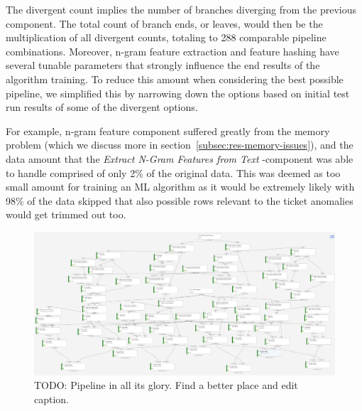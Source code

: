 The divergent count implies the number of branches
diverging from the previous component.
The total count of branch ends, or leaves,
would then be the multiplication of all divergent counts,
totaling to 288 comparable pipeline combinations.
Moreover,
n-gram feature extraction and feature hashing
have several tunable parameters
that strongly influence the end results of the algorithm training.
To reduce this amount when considering the best possible pipeline,
we simplified this by narrowing down the options
based on initial test run results of some of the divergent options.

For example,
n-gram feature component suffered greatly from the memory problem
(which we discuss more in section~\ref{subsec:res-memory-issues}),
and the data amount that the \textit{Extract N-Gram Features from Text} -component was able to handle
comprised of only 2\% of the original data.
This was deemed as too small amount for training an ML algorithm
as it would be extremely likely with 98\% of the data skipped
that also possible rows relevant to the ticket anomalies
would get trimmed out too.






\begin{figure}[htb]
    \centering
    \includegraphics[width=150mm]{./appendices/pipeline-draft}
    \caption{TODO: Pipeline in all its glory. Find a better place and edit caption.
    \label{fig:pipeline draft}}
\end{figure}







